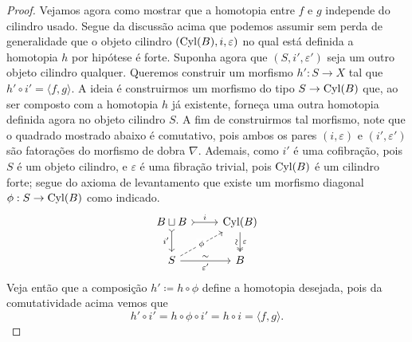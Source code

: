 \begin{proof}
  Vejamos agora como mostrar que a homotopia entre $f$ e $g$ independe do cilindro usado.
  Segue da discussão acima que podemos assumir sem perda de generalidade que o objeto cilindro $(\mathrm{Cyl}(B),i,\varepsilon)$ no qual está definida a homotopia $h$ por hipótese é forte.
  Suponha agora que $(S,i',\varepsilon')$ seja um outro objeto cilindro qualquer.
  Queremos construir um morfismo $h': S \to X$ tal que $h' \circ i' = \langle f,g \rangle$.
  A ideia é construirmos um morfismo do tipo $S \to \mathrm{Cyl}(B)$ que, ao ser composto com a homotopia $h$ já existente, forneça uma outra homotopia definida agora no objeto cilindro $S$.
  A fim de construirmos tal morfismo, note que o quadrado mostrado abaixo é comutativo, pois ambos os pares $(i,\varepsilon)$ e $(i',\varepsilon')$ são fatorações do morfismo de dobra $\nabla$.
  Ademais, como $i'$ é uma cofibração, pois $S$ é um objeto cilindro, e $\varepsilon$ é uma fibração trivial, pois $\mathrm{Cyl}(B)$ é um cilindro forte; segue do axioma de levantamento que existe um morfismo diagonal $\phi: S \to \mathrm{Cyl}(B)$ como indicado.
  \begin{displaymath}
    \begin{tikzcd}
      B \sqcup B
      \arrow[r, tail, "i"]
      \arrow[d, tail, "i'" swap]
      & \Cyl(B)
      \arrow[d, two heads, "\varepsilon", "\sim" {swap,sloped}]
      \\ S
      \arrow[r, "\sim", "\varepsilon'" {swap}]
      \arrow[ru, dashed, "\phi" description]
      & B
    \end{tikzcd}
  \end{displaymath}
  Veja então que a composição $h' \coloneqq h \circ \phi$ define a homotopia desejada, pois da comutatividade acima vemos que
  \begin{displaymath}
    h' \circ i' = h \circ \phi \circ i' = h \circ i = \langle f,g \rangle.
  \end{displaymath}


\end{proof}
